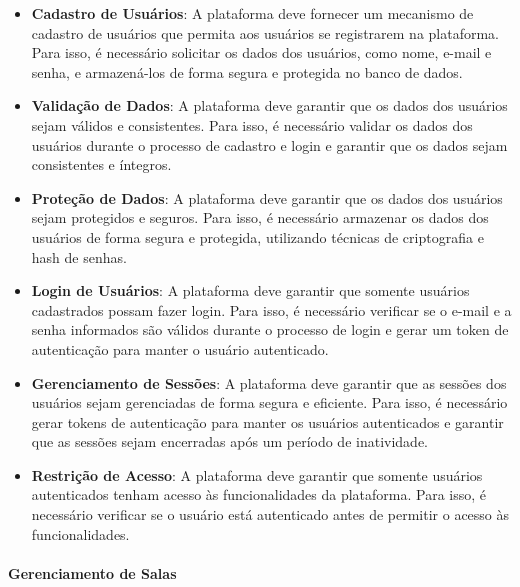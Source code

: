 \begin{itemize}
    \item \textbf{Cadastro de Usuários}: A plataforma deve fornecer um mecanismo de cadastro de usuários que permita aos usuários se registrarem na plataforma. Para isso, é necessário solicitar os dados dos usuários, como nome, e-mail e senha, e armazená-los de forma segura e protegida no banco de dados.
    \item \textbf{Validação de Dados}: A plataforma deve garantir que os dados dos usuários sejam válidos e consistentes. Para isso, é necessário validar os dados dos usuários durante o processo de cadastro e login e garantir que os dados sejam consistentes e íntegros.
    \item \textbf{Proteção de Dados}: A plataforma deve garantir que os dados dos usuários sejam protegidos e seguros. Para isso, é necessário armazenar os dados dos usuários de forma segura e protegida, utilizando técnicas de criptografia e hash de senhas.
    \item \textbf{Login de Usuários}: A plataforma deve garantir que somente usuários cadastrados possam fazer login. Para isso, é necessário verificar se o e-mail e a senha informados são válidos durante o processo de login e gerar um token de autenticação para manter o usuário autenticado.
    \item \textbf{Gerenciamento de Sessões}: A plataforma deve garantir que as sessões dos usuários sejam gerenciadas de forma segura e eficiente. Para isso, é necessário gerar tokens de autenticação para manter os usuários autenticados e garantir que as sessões sejam encerradas após um período de inatividade.
    \item \textbf{Restrição de Acesso}: A plataforma deve garantir que somente usuários autenticados tenham acesso às funcionalidades da plataforma. Para isso, é necessário verificar se o usuário está autenticado antes de permitir o acesso às funcionalidades.
\end{itemize}

\paragraph{Gerenciamento de Salas}

